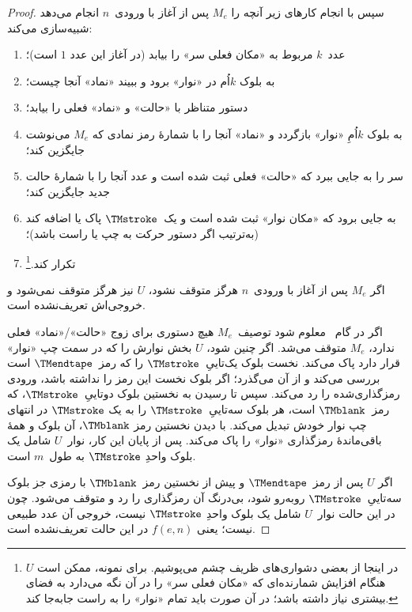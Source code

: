 \documentclass[../../../include/open-logic-section]{subfiles}
\begin{document}
\begin{proof}
  سپس با انجام کارهای زیر آنچه را $M_e$ پس از آغاز با ورودی~$n$ انجام
  می‌دهد شبیه‌سازی می‌کند:
  \begin{enumerate}
    \item عدد~$k$ مربوط به «مکان فعلی سر» را بیابد (در آغاز این عدد
      $1$ است)؛
    \item به بلوک $k$اُم در «نوار» برود و ببیند «نماد» آنجا چیست؛
    \item{}%
      دستور متناظر با «حالت» و «نماد» فعلی را بیابد؛
    \item به بلوک $k$اُمِ «نوار» بازگردد و «نماد» آنجا را با شمارهٔ
      رمز نمادی که $M_e$ می‌نوشت جایگزین کند؛
    \item سر را به جایی ببرد که «حالت» فعلی ثبت شده است و عدد آنجا را
      با شمارهٔ حالت جدید جایگزین کند؛
    \item به جایی برود که «مکان نوار» ثبت شده است و یک~$\TMstroke$
      پاک یا اضافه کند (به‌ترتیب اگر دستور حرکت به چپ یا راست باشد)؛
    \item تکرار کند.\footnote{در اینجا از بعضی دشواری‌های ظریف چشم
      می‌پوشیم. برای نمونه، ممکن است $U$ هنگام افزایش شمارنده‌ای که
      «مکان فعلی سر» را در آن نگه می‌دارد به فضای بیشتری نیاز داشته
      باشد؛ در آن صورت باید تمام «نوار» را به راست جابه‌جا کند.}
  \end{enumerate}
  اگر $M_e$ پس از آغاز با ورودی~$n$ هرگز متوقف نشود، $U$ نیز هرگز
  متوقف نمی‌شود و خروجی‌اش تعریف‌نشده است.

  اگر در گام~ معلوم شود توصیف~$M_e$ هیچ دستوری برای
  زوج «حالت»/«نماد» فعلی ندارد، $M_e$ متوقف می‌شد. اگر چنین شود، $U$
  بخش نوارش را که در سمت چپ «نوار» قرار دارد پاک می‌کند. نخست بلوک
  یک‌تاییِ~$\TMstroke$ را که رمز~$\TMendtape$ است بررسی می‌کند و از آن می‌گذرد؛
  اگر بلوک نخست این رمز را نداشته باشد، ورودی رمزگذاری‌شده را رد
  می‌کند. سپس تا رسیدن به نخستین بلوک دوتاییِ~$\TMstroke$، که
  رمز~$\TMblank$ است، هر بلوک سه‌تاییِ~$\TMstroke$ را به یک
  $\TMstroke$ در انتهای چپ نوار خودش تبدیل می‌کند. با دیدن نخستین رمز
  $\TMblank$، آن بلوک و همهٔ باقی‌ماندهٔ رمزگذاری «نوار» را پاک
  می‌کند. پس از پایان این کار، نوار~$U$ شامل یک بلوک واحدِ
  $\TMstroke$ به طول~$m$ است.

  اگر $U$ پس از رمز~$\TMendtape$ و پیش از نخستین رمز~$\TMblank$ با
  رمزی جز بلوک سه‌تاییِ~$\TMstroke$ روبه‌رو شود، بی‌درنگ آن رمزگذاری
  را رد و متوقف می‌شود. چون در این حالت نوار~$U$ شامل یک بلوک واحدِ
  $\TMstroke$ نیست، خروجی آن عدد طبیعی نیست؛ یعنی $f(e,n)$ در این
  حالت تعریف‌نشده است.
\end{proof}
\end{document}
